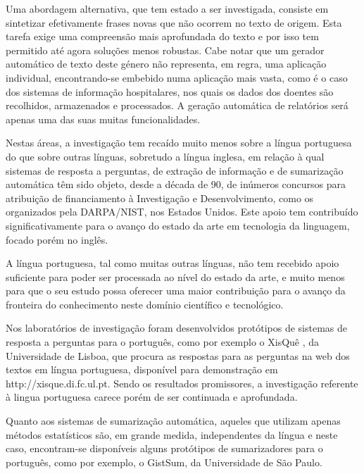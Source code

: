 \begin{multicols}{2}
Uma abordagem alternativa, que tem estado a ser investigada, consiste em sintetizar efetivamente frases novas
que não ocorrem no texto de origem. 
Esta tarefa exige uma compreensão mais aprofundada do texto e por isso tem permitido
até agora soluções menos robustas. 
Cabe notar que um gerador automático de texto deste género não representa, em regra, uma aplicação individual, 
encontrando-se embebido numa aplicação mais vasta, como é o caso dos sistemas de informação hospitalares, 
nos quais os dados dos doentes são recolhidos, armazenados e processados. 
A geração automática de relatórios será apenas uma das suas muitas funcionalidades.

Nestas áreas, a investigação tem recaído muito menos sobre a língua portuguesa do que 
sobre outras línguas, sobretudo a língua inglesa, em relação à qual sistemas 
de resposta a perguntas, de extração de informação e de sumarização automática têm sido objeto, 
desde a década de 90, de inúmeros concursos para atribuição de financiamento à Investigação
e Desenvolvimento, como os organizados pela DARPA/NIST, nos Estados Unidos.  
Este apoio tem contribuído significativamente para o avanço do estado da arte
em tecnologia da linguagem, focado porém no inglês. 

A língua portuguesa, tal como muitas outras línguas, não tem recebido apoio suficiente
para poder ser processada ao nível do estado da arte, e muito menos para
que o seu estudo possa oferecer uma maior contribuição para o avanço 
da fronteira do conhecimento neste domínio científico e tecnológico.


Nos laboratórios de investigação foram desenvolvidos protótipos de sistemas de resposta 
a perguntas para o português, como por exemplo o XisQuê \cite{xisque}, da Universidade
de Lisboa, que procura as respostas para as perguntas na web dos textos em língua portuguesa, 
disponível para demonstração em http://xisque.di.fc.ul.pt.
Sendo os resultados promissores, a investigação referente à lingua portuguesa 
carece porém de ser continuada e aprofundada.

Quanto aos sistemas de sumarização automática, aqueles que utilizam apenas 
métodos estatísticos são, em grande medida, independentes da língua e neste caso, 
encontram-se disponíveis alguns protótipos de sumarizadores para o português,
como por exemplo, o GistSum, da Universidade de São Paulo.


\end{multicols}
